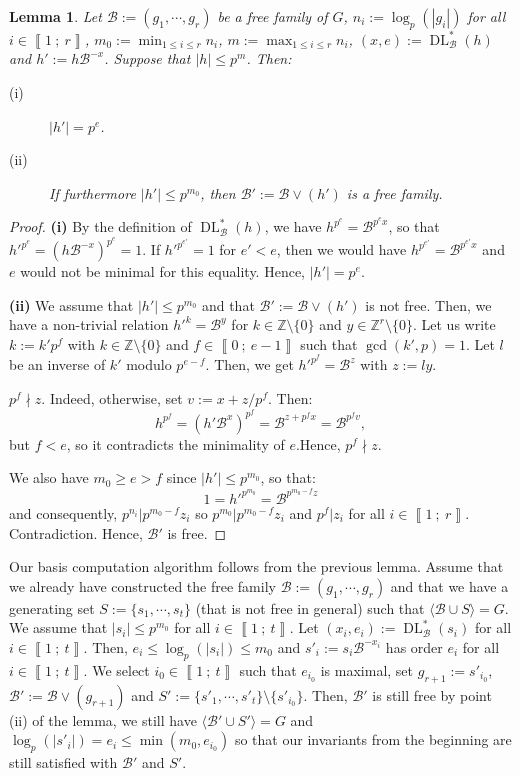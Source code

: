 \documentclass[a4paper,10pt]{report}
\theoremstyle{definition}
\theoremstyle{plain}
\newtheorem{Lemma}[Definition]{Lemma}
\theoremstyle{definition}
\newcommand{\Z}{\mathbb{Z}}
\newcommand{\m}[1]{\mathcal{#1}}
\renewcommand{\i}[2]{\left\llbracket #1~;~#2\right\rrbracket}
\renewcommand{\(}{\left(}
\renewcommand{\)}{\right)}
\DeclareMathOperator{\DL}{DL}
\begin{document}
\begin{Lemma}
Let $\m{B}:=(g_1,\cdots, g_r)$ be a free family of $G$, $n_i:=\log_p(|g_i|)$ for all  $i\in\i{1}{r}$, $m_0:=\min_{1\leq i\leq r} n_i$, $m:=\max_{1\leq i\leq r} n_i$, $(x,e):=\DL_{\m{B}}^*(h)$ and $h':=h\m{B}^{-x}$. Suppose that $|h|\leq p^m$. Then:

\begin{description}
\item[(i)] $|h'|=p^e$.
\item[(ii)] If furthermore $|h'|\leq p^{m_0}$, then $\m{B}':=\m{B}\vee (h')$ is a free family.
\end{description}
\end{Lemma}

\begin{proof}
\textbf{(i)} By the definition of $\DL_{\m{B}}^*(h)$, we have $h^{p^e}=\m{B}^{p^ex}$, so that ${h'}^{p^e}=(h\m{B}^{-x})^{p^e}=1$. If ${h'}^{p^{e'}}=1$ for $e'<e$, then we would have $h^{p^{e'}}=\m{B}^{p^{e'} x}$ and $e$ would not be minimal for this equality. Hence, $|h'|=p^e$.

\textbf{(ii)} We assume that $|h'|\leq p^{m_0}$ and that $\m{B}':=\m{B}\vee (h')$ is not free. Then, we have a non-trivial relation ${h'}^k=\m{B}^y$ for $k\in\Z\setminus\{0\}$ and $y\in\Z^r\setminus\{0\}$. Let us write $k:=k'p^f$ with $k\in\Z\setminus\{0\}$ and $f\in\i{0}{e-1}$ such that $\gcd(k',p)=1$. Let $l$ be an inverse of $k'$ modulo $p^{e-f}$. Then, we get $h'^{p^f}=\m{B}^{z}$ with $z:=ly$. 

$p^f\nmid z$. Indeed, otherwise, set $v:=x+z/p^f$. Then:
\[h^{p^f}=(h'\m{B}^x)^{p^f}=\m{B}^{z+p^fx}=\m{B}^{p^f v},\]
but $f<e$, so it contradicts the minimality of $e$.Hence, $p^f\nmid z$.

We also have $m_0\geq e>f$ since $|h'|\leq p^{m_0}$, so that: 
\[1={h'}^{p^{m_0}}=\m{B}^{p^{m_0-f}z}\]
and consequently, $p^{n_i}|p^{m_0-f}z_i$ so $p^{m_0}|p^{m_0-f}z_i$ and $p^f| z_i$ for all $i\in\i{1}{r}$. Contradiction. Hence, $\m{B}'$ is free.
\end{proof}

Our basis computation algorithm follows from the previous lemma. Assume that we already have constructed the free family $\m{B}:=(g_1,\cdots, g_r)$ and that we have a generating set $S:=\{s_1,\cdots, s_t\}$ (that is not free in general) such that $\langle\m{B}\cup S\rangle=G$.  We assume that $|s_i|\leq p^{m_0}$ for all $i\in\i{1}{t}$. Let $(x_i,e_i):=\DL_{\m{B}}^*(s_i)$ for all $i\in\i{1}{t}$. Then, $e_i\leq \log_p(|s_i|)\leq m_0$ and $s'_i:=s_i\m{B}^{-x_i}$ has order $e_i$ for all $i\in\i{1}{t}$. We select $i_0\in\i{1}{t}$ such that $e_{i_0}$ is maximal, set $g_{r+1}:=s'_{i_0}$, $\m{B}':=\m{B}\vee(g_{r+1})$ and $S':=\{s'_1,\cdots, s'_t\}\setminus\{s'_{i_0}\}$. Then, $\m{B}'$ is still free by point (ii) of the lemma, we still have $\langle\m{B}'\cup S'\rangle=G$ and $\log_p(|s'_i|)=e_i\leq\min(m_0,e_{i_0})$ so that our invariants from the beginning are still satisfied with $\m{B}'$ and $S'$. 
\end{document}
